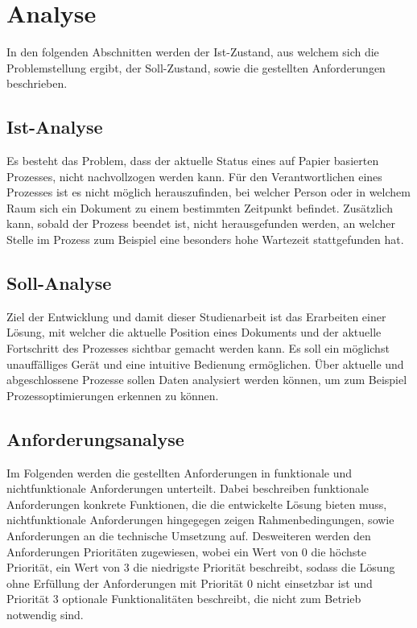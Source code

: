 \chapter{Analyse} \label{chap:analyse}

In den folgenden Abschnitten werden der Ist-Zustand, aus welchem sich die Problemstellung ergibt,
der Soll-Zustand, sowie die gestellten Anforderungen beschrieben.

\section{Ist-Analyse} \label{sec:ist-analyse}

Es besteht das Problem, dass der aktuelle Status eines auf Papier basierten Prozesses, nicht nachvollzogen werden kann.
Für den Verantwortlichen eines Prozesses ist es nicht möglich herauszufinden, bei welcher Person oder in welchem Raum sich ein Dokument
zu einem bestimmten Zeitpunkt befindet.
Zusätzlich kann, sobald der Prozess beendet ist, nicht herausgefunden werden, an welcher Stelle im Prozess zum Beispiel eine besonders
hohe Wartezeit stattgefunden hat.

\section{Soll-Analyse} \label{sec:soll-analyse}

Ziel der Entwicklung und damit dieser Studienarbeit ist das Erarbeiten einer Lösung, mit welcher die aktuelle Position eines Dokuments und der aktuelle Fortschritt des Prozesses sichtbar gemacht werden kann.
Es soll ein möglichst unauffälliges Gerät und eine intuitive Bedienung ermöglichen.
Über aktuelle und abgeschlossene Prozesse sollen Daten analysiert werden können, um zum Beispiel Prozessoptimierungen erkennen zu können.

\section{Anforderungsanalyse} \label{sec:anforderungsanalyse}

Im Folgenden werden die gestellten Anforderungen in funktionale und nichtfunktionale Anforderungen
unterteilt.
Dabei beschreiben funktionale Anforderungen konkrete Funktionen, die die entwickelte Lösung bieten
muss, nichtfunktionale Anforderungen hingegegen zeigen Rahmenbedingungen, sowie Anforderungen an die
technische Umsetzung auf.
Desweiteren werden den Anforderungen Prioritäten zugewiesen, wobei ein Wert von 0 die höchste
Priorität, ein Wert von 3 die niedrigste Priorität beschreibt, sodass die Lösung ohne Erfüllung der
Anforderungen mit Priorität 0 nicht einsetzbar ist und Priorität 3 optionale Funktionalitäten
beschreibt, die nicht zum Betrieb notwendig sind.

